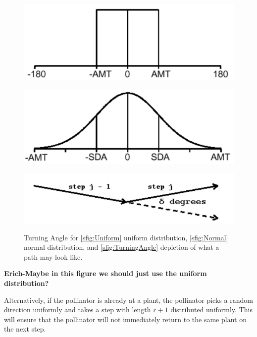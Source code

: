\begin{figure}[h!]
  \begin{center}
  \begin{minipage}[b]{0.48\textwidth}
    \includegraphics[scale=0.4]{Figures/UniformTADistribution.pdf}
     \label{sfig:Uniform}
  \end{minipage}
  \begin{minipage}[b]{0.48\textwidth}
    \includegraphics[scale=0.4]{Figures/NormalTADistribution.pdf}
     \label{sfig:Normal}
  \end{minipage}
  \includegraphics[scale=0.5]{Figures/TurningAngle.pdf}
   \label{sfig:TurningAngle}
  \end{center}
  \caption{Turning Angle for \ref{sfig:Uniform} uniform distribution,
  \ref{sfig:Normal} normal distribution, and \ref{sfig:TurningAngle} depiction
  of what a path may look like.}\label{fig:TurningAngle}
\end{figure}
{\bf Erich-Maybe in this figure we should just use the uniform distribution?}


Alternatively, if the pollinator is already at a plant, the pollinator picks a
random direction uniformly and takes a step with length $r+1$ distributed
uniformly.  This will ensure that the pollinator will not immediately return to
the same plant on the next step.

